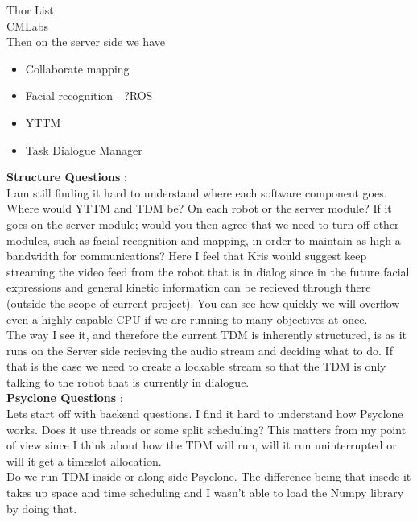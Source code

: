 \documentclass[a4, 12pt]{letter}
\begin{document}
\begin{letter}{Thor List \\ CMLabs \\ }
Then on the server side we have
\begin{itemize}
	\item Collaborate mapping
	\item Facial recognition - ?ROS
	\item YTTM
	\item Task Dialogue Manager
\end{itemize}

\textbf{Structure Questions} : \\
I am still finding it hard to understand where each software component goes. Where would YTTM and TDM be? On each robot or the server module? If it goes on the server module; would you then agree that we need to turn off other modules, such as facial recognition and mapping, in order to maintain as high a bandwidth for communications? Here I feel that Kris would suggest keep streaming the video feed from the robot that is in dialog since in the future facial expressions and general kinetic information can be recieved through there (outside the scope of current project). You can see how quickly we will overflow even a highly capable CPU if we are running to many objectives at once. \\
The way I see it, and therefore the current TDM is inherently structured, is as it runs on the Server  side recieving the audio stream and deciding what to do. If that is the case we need to create a lockable stream so that the TDM is only talking to the robot that is currently in dialogue. \\


\textbf{Psyclone Questions} : \\
Lets start off with backend questions. I find it hard to understand how Psyclone works. Does it use threads or some split scheduling? This matters from my point of view since I think about how the TDM will run, will it run uninterrupted or will it get a timeslot allocation.  \\
Do we run TDM inside or along-side Psyclone. The difference being that insede it takes up space and time scheduling and I wasn't able to load the Numpy library by doing that. \\


\end{letter}
\end{document}
